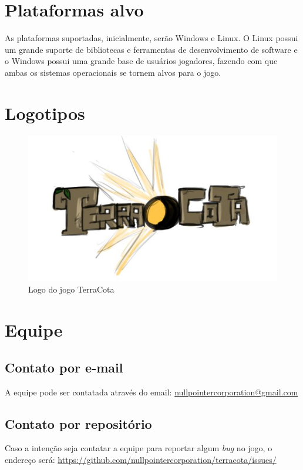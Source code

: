 \documentclass[11pt]{article}
\begin{document}
\section{Plataformas alvo}
As plataformas suportadas, inicialmente, serão Windows e Linux.
O Linux possui um grande suporte de bibliotecas e ferramentas de desenvolvimento de software e o Windows possui uma grande base de usuários jogadores, fazendo com que ambas os sistemas operacionais se tornem alvos para o jogo.

\section{Logotipos}

\begin{figure}[!htp]
\centering
\includegraphics[scale=0.75]{logo-terracota.jpg}
\caption{Logo do jogo TerraCota}
\label{TerraCota logo}
\end{figure}

\section{Equipe}
\subsection{Contato por e-mail}
A equipe pode ser contatada através do email: \url{nullpointercorporation@gmail.com}

\subsection{Contato por repositório}
Caso a intenção seja contatar a equipe para reportar algum \textit{bug} no jogo, o endereço será: \url{https://github.com/nullpointercorporation/terracota/issues/}
\newpage
\end{document}

